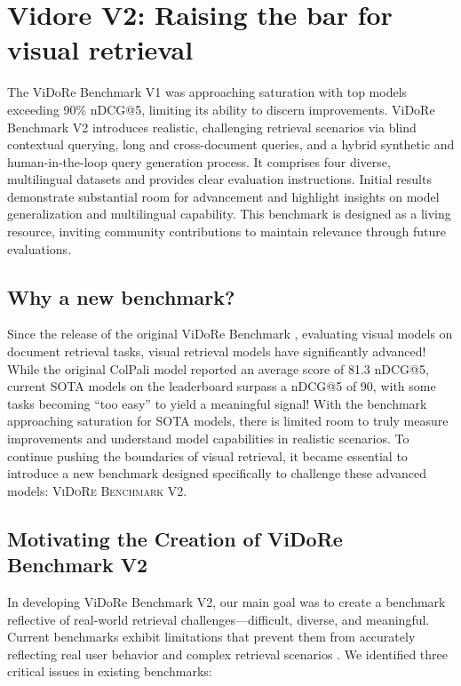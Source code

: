 \setchapterpreamble[u]{\margintoc}
\chapter{Vidore V2: Raising the bar for visual retrieval}


\begin{kaobox}[frametitle=Paper Abstract]
The ViDoRe Benchmark V1 was approaching saturation with top models exceeding 90\% nDCG@5, limiting its ability to discern improvements. ViDoRe Benchmark V2 introduces realistic, challenging retrieval scenarios via blind contextual querying, long and cross-document queries, and a hybrid synthetic and human-in-the-loop query generation process. It comprises four diverse, multilingual datasets and provides clear evaluation instructions. Initial results demonstrate substantial room for advancement and highlight insights on model generalization and multilingual capability. This benchmark is designed as a living resource, inviting community contributions to maintain relevance through future evaluations.

\end{kaobox}

\section*{Why a new benchmark?}
Since the release of the original ViDoRe Benchmark , evaluating visual models on document retrieval tasks, visual retrieval models have significantly advanced! While the original ColPali model reported an average score of 81.3 nDCG@5, current SOTA models on the leaderboard surpass a nDCG@5 of 90, with some tasks becoming “too easy” to yield a meaningful signal!
With the benchmark approaching saturation for SOTA models, there is limited room to truly measure improvements and understand model capabilities in realistic scenarios. To continue pushing the boundaries of visual retrieval, it became essential to introduce a new benchmark designed specifically to challenge these advanced models: \textsc{ViDoRe Benchmark V2}.

\section{Motivating the Creation of ViDoRe Benchmark V2}
In developing ViDoRe Benchmark V2, our main goal was to create a benchmark reflective of real-world retrieval challenges—difficult, diverse, and meaningful. Current benchmarks exhibit limitations that prevent them from accurately reflecting real user behavior and complex retrieval scenarios . We identified three critical issues in existing benchmarks:

